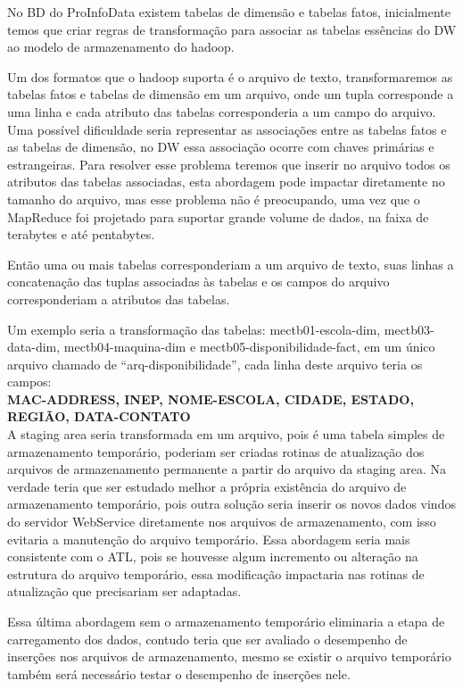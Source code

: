 \documentclass[a4paper,12pt]{article}
\begin{document}
No BD do ProInfoData existem tabelas de dimensão e tabelas fatos, inicialmente
temos que criar regras de transformação para associar as tabelas essências do
DW ao modelo de armazenamento do hadoop.

Um dos formatos que o hadoop suporta é o arquivo de texto, transformaremos as
tabelas fatos e tabelas de dimensão em um arquivo, onde um tupla corresponde a
uma linha e cada atributo das tabelas corresponderia a um campo do arquivo. Uma
possível dificuldade seria representar as associações entre as tabelas fatos e
as tabelas de dimensão, no DW essa associação ocorre com chaves primárias e
estrangeiras. Para resolver esse problema teremos que inserir no arquivo todos
os atributos das tabelas associadas, esta abordagem pode impactar diretamente no
tamanho do arquivo, mas esse problema não é preocupando, uma vez que o MapReduce
foi projetado para suportar grande volume de dados, na faixa de terabytes e até
pentabytes.

Então uma ou mais tabelas corresponderiam a um arquivo de texto, suas linhas a
concatenação das tuplas associadas às tabelas e os campos do arquivo
corresponderiam a atributos das tabelas.

Um exemplo seria a transformação das tabelas: mectb01-escola-dim,
mectb03-data-dim, mectb04-maquina-dim e mectb05-disponibilidade-fact, em um
único arquivo chamado de “arq-disponibilidade”, cada linha deste arquivo teria
os campos:\\

\textbf{MAC-ADDRESS, INEP, NOME-ESCOLA, CIDADE, ESTADO, REGIÃO, DATA-CONTATO}\\

A staging area seria transformada em um arquivo, pois é uma tabela simples de
armazenamento temporário, poderiam ser criadas rotinas de atualização dos
arquivos de armazenamento permanente a partir do arquivo da staging area. Na
verdade teria que ser estudado melhor a própria existência do arquivo de
armazenamento temporário, pois outra solução seria inserir os novos dados vindos
do servidor WebService diretamente nos arquivos de armazenamento, com isso
evitaria a manutenção do arquivo temporário. Essa abordagem seria mais
consistente com o ATL, pois se houvesse algum incremento ou alteração na
estrutura do arquivo temporário, essa modificação impactaria nas rotinas de
atualização que precisariam ser adaptadas.
 
Essa última abordagem sem o armazenamento temporário eliminaria a etapa de
carregamento dos dados, contudo teria que ser avaliado o desempenho de inserções
nos arquivos de armazenamento, mesmo se existir o arquivo temporário também será
necessário testar o desempenho de inserções nele.
\end{document}
